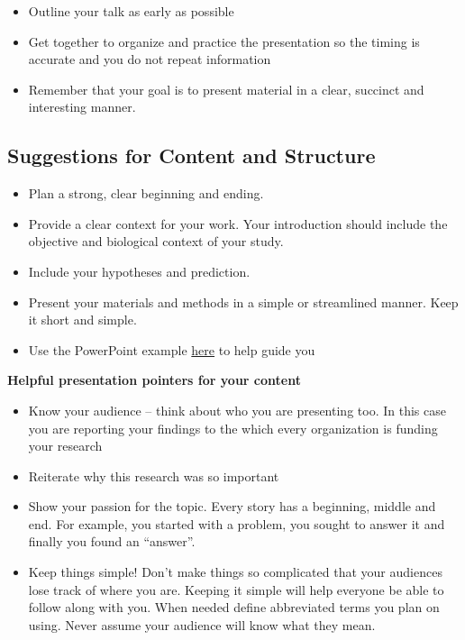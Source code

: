 \documentclass[
]{book}
\providecommand{\tightlist}{%
  \setlength{\itemsep}{0pt}\setlength{\parskip}{0pt}}
\begin{document}
\begin{itemize}
\tightlist
\item
  Outline your talk as early as possible
\item
  Get together to organize and practice the presentation so the timing is accurate and you do not repeat information
\item
  Remember that your goal is to present material in a clear, succinct and interesting manner.
\end{itemize}

\hypertarget{suggestions-for-content-and-structure}{%
\subsection*{Suggestions for Content and Structure}\label{suggestions-for-content-and-structure}}

\begin{itemize}
\tightlist
\item
  Plan a strong, clear beginning and ending.
\item
  Provide a clear context for your work. Your introduction should include the objective and biological context of your study.
\item
  Include your hypotheses and prediction.
\item
  Present your materials and methods in a simple or streamlined manner. Keep it short and simple.
\item
  Use the PowerPoint example \href{https://osf.io/download/te4x7}{here} to help guide you
\end{itemize}

\textbf{Helpful presentation pointers for your content}

\begin{itemize}
\tightlist
\item
  Know your audience -- think about who you are presenting too. In this case you are reporting your findings to the which every organization is funding your research
\item
  Reiterate why this research was so important
\item
  Show your passion for the topic. Every story has a beginning, middle and end. For example, you started with a problem, you sought to answer it and finally you found an ``answer''.
\item
  Keep things simple! Don't make things so complicated that your audiences lose track of where you are. Keeping it simple will help everyone be able to follow along with you. When needed define abbreviated terms you plan on using. Never assume your audience will know what they mean.
\end{itemize}
\end{document}
